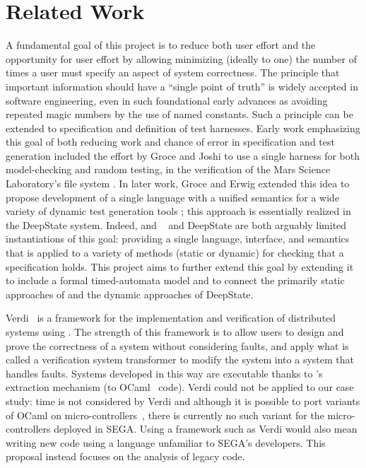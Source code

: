 \section{Related Work}

A fundamental goal of this project is to reduce both user effort and
the opportunity for user effort by allowing minimizing (ideally to
one) the number of times a user must specify an aspect of system
correctness.  The principle that important information should have a
``single point of truth'' is widely accepted in software engineering,
even in such foundational early advances as avoiding repeated magic
numbers by the use of named constants.  Such a principle can be
extended to specification and definition of test harnesses.  Early
work emphasizing this goal of both reducing work and chance of error
in specification and test generation included the effort by Groce and
Joshi to use a single harness for both model-checking and random
testing, in the verification of the Mars Science Laboratory's file
system \cite{WODA08,CFV08,AMAI}.  In later work, Groce and Erwig
extended this idea to propose development of a single language with a
unified semantics for a wide variety of dynamic test generation tools
\cite{WODACommon}; this approach is essentially realized in the
DeepState \cite{DeepState} system.  Indeed, \framac and
\acsl~\cite{ACSL} and DeepState are both arguably limited
instantiations of this goal: providing a single language, interface,
and semantics that is applied to a variety of methods (static or
dynamic) for checking that a specification holds.  This project aims
to further extend this goal by extending it to include a formal
timed-automata model and to connect the primarily static approaches of
\framac and the dynamic approaches of DeepState.

Verdi~\cite{WWP2015:PLDI,WWA2016:CPP} is a framework for the
implementation and verification of distributed systems using \Coq. The
strength of this framework is to allow users to design and prove the
correctness of a system without considering faults, and apply what is
called a verification system transformer to modify the system into a
system that handles faults.  Systems developed in this way are
executable thanks to \Coq's extraction mechanism (to
OCaml~\cite{MIN2011:CACM} code). Verdi could not be applied to our
case study: time is not considered by Verdi and although it is
possible to port variants of OCaml on
micro-controllers~\cite{VWC2015:PADL}, there is currently no such
variant for the micro-controllers deployed in SEGA. Using a framework
such as Verdi would also mean writing new code using a language
unfamiliar to SEGA's developers. This proposal instead focuses on the
analysis of legacy code.

